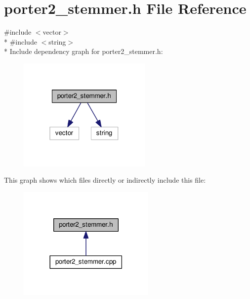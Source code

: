 \section{porter2\+\_\+stemmer.\+h File Reference}
\label{porter2__stemmer_8h}
{\ttfamily \#include $<$vector$>$}\\*
{\ttfamily \#include $<$string$>$}\\*
Include dependency graph for porter2\+\_\+stemmer.\+h\+:\nopagebreak
\begin{figure}[H]
\begin{center}
\leavevmode
\includegraphics[width=184pt]{porter2__stemmer_8h__incl}
\end{center}
\end{figure}
This graph shows which files directly or indirectly include this file\+:\nopagebreak
\begin{figure}[H]
\begin{center}
\leavevmode
\includegraphics[width=189pt]{porter2__stemmer_8h__dep__incl}
\end{center}
\end{figure}
